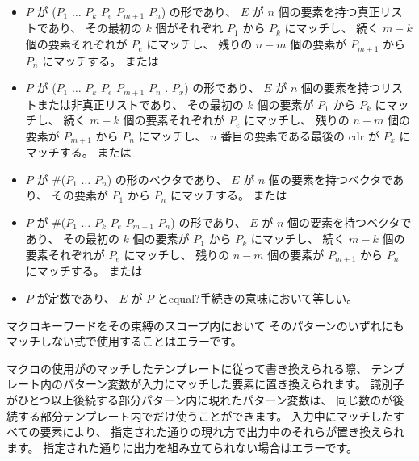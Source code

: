 \begin{entry}
\begin{itemize}
\item $P$ が
      {\cf ($P_1$ $\dots$ $P_k$ $P_e$  $P_{m+1}$ \dotsfoo{} $P_n$)}
      の形であり、
      $E$ が $n$ 個の要素を持つ真正リストであり、
      その最初の $k$ 個がそれぞれ $P_1$ から $P_k$ にマッチし、
      続く $m-k$ 個の要素それぞれが $P_e$ にマッチし、
      残りの $n-m$ 個の要素が $P_{m+1}$ から $P_n$ にマッチする。
      または

\item $P$ が
      {\cf ($P_1$ $\dots$ $P_k$ $P_{e}$  $P_{m+1}$ \dotsfoo{} $P_n$ . $P_x$)}
      の形であり、
      $E$ が $n$ 個の要素を持つリストまたは非真正リストであり、
      その最初の $k$ 個の要素が $P_1$ から $P_k$ にマッチし、
      続く $m-k$ 個の要素それぞれが $P_e$ にマッチし、
      残りの $n-m$ 個の要素が $P_{m+1}$ から $P_n$ にマッチし、
      $n$ 番目の要素である最後の cdr が $P_x$ にマッチする。
      または

\item $P$ が {\cf \#($P_1$ $\dots$ $P_n$)} の形のベクタであり、
      $E$ が $n$ 個の要素を持つベクタであり、
      その要素が $P_1$ から $P_n$ にマッチする。
      または

\item $P$ が
      {\cf \#($P_1$ $\dots$ $P_k$ $P_{e}$  $P_{m+1}$ \dotsfoo $P_n$)}
      の形であり、
      $E$ が $n$ 個の要素を持つベクタであり、
      その最初の $k$ 個の要素が $P_1$ から $P_k$ にマッチし、
      続く $m-k$ 個の要素それぞれが $P_e$ にマッチし、
      残りの $n-m$ 個の要素が $P_{m+1}$ から $P_n$ にマッチする。
      または

\item $P$ が定数であり、 $E$ が $P$ と{\cf equal?}手続きの意味において等しい。
\end{itemize}

マクロキーワードをその束縛のスコープ内において
そのパターンのいずれにもマッチしない式で使用することはエラーです。

マクロの使用がのマッチしたテンプレートに従って書き換えられる際、
テンプレート内のパターン変数が入力にマッチした要素に置き換えられます。
識別子がひとつ以上後続する部分パターン内に現れたパターン変数は、
同じ数のが後続する部分テンプレート内でだけ使うことができます。
入力中にマッチしたすべての要素により、
指定された通りの現れ方で出力中のそれらが置き換えられます。
指定された通りに出力を組み立てられない場合はエラーです。



\end{entry}
